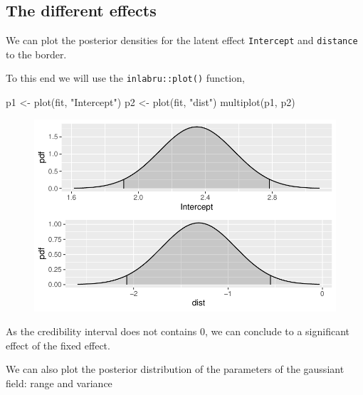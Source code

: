 \documentclass[
  a4paper,
]{article}
\newenvironment{Shaded}{\begin{snugshade}}{\end{snugshade}}
\newcommand{\FunctionTok}[1]{\textcolor[rgb]{0.28,0.35,0.67}{#1}}
\newcommand{\NormalTok}[1]{\textcolor[rgb]{0.00,0.23,0.31}{#1}}
\newcommand{\OtherTok}[1]{\textcolor[rgb]{0.00,0.23,0.31}{#1}}
\newcommand{\StringTok}[1]{\textcolor[rgb]{0.13,0.47,0.30}{#1}}
\begin{document}
\hypertarget{the-different-effects}{%
\subsection{The different effects}\label{the-different-effects}}

We can plot the posterior densities for the latent effect
\texttt{Intercept} and \texttt{distance} to the border.

To this end we will use the \texttt{inlabru::plot()} function,

\begin{Shaded}
\begin{Highlighting}[]
\NormalTok{p1 }\OtherTok{\textless{}{-}} \FunctionTok{plot}\NormalTok{(fit, }\StringTok{"Intercept"}\NormalTok{)}
\NormalTok{p2 }\OtherTok{\textless{}{-}} \FunctionTok{plot}\NormalTok{(fit, }\StringTok{"dist"}\NormalTok{)}
\FunctionTok{multiplot}\NormalTok{(p1, p2)}
\end{Highlighting}
\end{Shaded}

\begin{figure}[H]

{\centering \includegraphics{pedometron_files/figure-pdf/unnamed-chunk-11-1.pdf}

}

\end{figure}

As the credibility interval does not contains 0, we can conclude to a
significant effect of the fixed effect.

We can also plot the posterior distribution of the parameters of the
gaussiant field: range and variance
\end{document}

